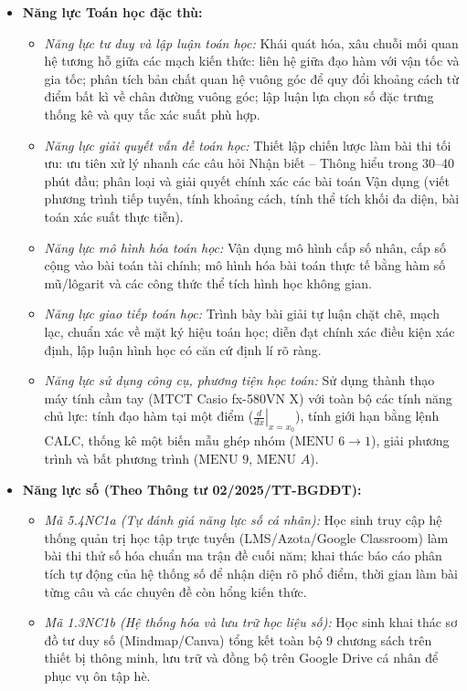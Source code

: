 \documentclass[12pt, a4paper]{article}
\begin{document}
\begin{itemize}[leftmargin=1.2cm]
    \item \textbf{Năng lực Toán học đặc thù:}
    \begin{itemize}[leftmargin=0.6cm]
        \item \textit{Năng lực tư duy và lập luận toán học:} Khái quát hóa, xâu chuỗi mối quan hệ tương hỗ giữa các mạch kiến thức: liên hệ giữa đạo hàm với vận tốc và gia tốc; phân tích bản chất quan hệ vuông góc để quy đổi khoảng cách từ điểm bất kì về chân đường vuông góc; lập luận lựa chọn số đặc trưng thống kê và quy tắc xác suất phù hợp.
        \item \textit{Năng lực giải quyết vấn đề toán học:} Thiết lập chiến lược làm bài thi tối ưu: ưu tiên xử lý nhanh các câu hỏi Nhận biết -- Thông hiểu trong 30--40 phút đầu; phân loại và giải quyết chính xác các bài toán Vận dụng (viết phương trình tiếp tuyến, tính khoảng cách, tính thể tích khối đa diện, bài toán xác suất thực tiễn).
        \item \textit{Năng lực mô hình hóa toán học:} Vận dụng mô hình cấp số nhân, cấp số cộng vào bài toán tài chính; mô hình hóa bài toán thực tế bằng hàm số mũ/lôgarit và các công thức thể tích hình học không gian.
        \item \textit{Năng lực giao tiếp toán học:} Trình bày bài giải tự luận chặt chẽ, mạch lạc, chuẩn xác về mặt ký hiệu toán học; diễn đạt chính xác điều kiện xác định, lập luận hình học có căn cứ định lí rõ ràng.
        \item \textit{Năng lực sử dụng công cụ, phương tiện học toán:} Sử dụng thành thạo máy tính cầm tay (MTCT Casio fx-580VN X) với toàn bộ các tính năng chủ lực: tính đạo hàm tại một điểm ($\left.\frac{d}{dx}\right|_{x=x_0}$), tính giới hạn bằng lệnh $\text{CALC}$, thống kê một biến mẫu ghép nhóm ($\text{MENU } 6 \to 1$), giải phương trình và bất phương trình ($\text{MENU } 9$, $\text{MENU } A$).
    \end{itemize}

    \item \textbf{Năng lực số (Theo Thông tư 02/2025/TT-BGDĐT):}
    \begin{itemize}[leftmargin=0.6cm]
        \item \textit{Mã 5.4NC1a (Tự đánh giá năng lực số cá nhân):} Học sinh truy cập hệ thống quản trị học tập trực tuyến (LMS/Azota/Google Classroom) làm bài thi thử số hóa chuẩn ma trận đề cuối năm; khai thác báo cáo phân tích tự động của hệ thống số để nhận diện rõ phổ điểm, thời gian làm bài từng câu và các chuyên đề còn hổng kiến thức.
        \item \textit{Mã 1.3NC1b (Hệ thống hóa và lưu trữ học liệu số):} Học sinh khai thác sơ đồ tư duy số (Mindmap/Canva) tổng kết toàn bộ 9 chương sách trên thiết bị thông minh, lưu trữ và đồng bộ trên Google Drive cá nhân để phục vụ ôn tập hè.
    \end{itemize}


\end{itemize}
\end{document}

